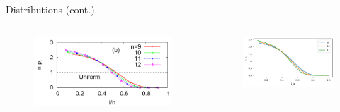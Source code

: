 \documentclass[xcolor={dvipsnames}]{beamer}
\begin{document}
\begin{frame}{Distributions (cont.)}
\begin{columns}[t]
    \begin{figure}
        \includegraphics[scale=0.25]{paper_scaled.PNG}
    \end{figure}
    \vspace{-2em}
    \begin{figure}
        \includegraphics[scale=0.5]{mine_scaled.PNG}
    \end{figure}
\end{columns}
\end{frame}
\end{document}
